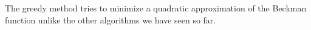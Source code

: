 The greedy method tries to minimize a quadratic approximation of the
Beckman function unlike the other algorithms we have seen so far.





